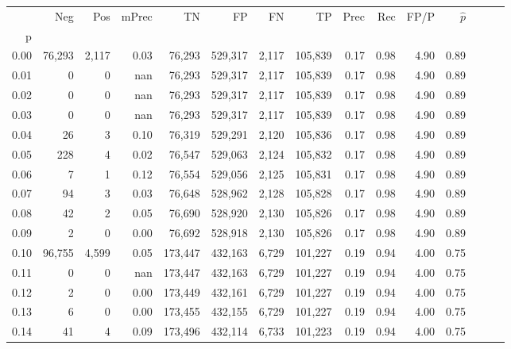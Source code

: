 \begin{tabular}{rrrrrrrrrrrrrrr}
\toprule
{} &     Neg &     Pos & mPrec &       TN &       FP &       FN &       TP &  Prec &   Rec &  FP/P & $\hat{p}$ \\
p    &         &         &       &          &          &          &          &       &       &       &           \\
\midrule
0.00 &  76,293 &   2,117 &  0.03 &   76,293 &  529,317 &    2,117 &  105,839 &  0.17 &  0.98 &  4.90 &      0.89 \\
0.01 &       0 &       0 &   nan &   76,293 &  529,317 &    2,117 &  105,839 &  0.17 &  0.98 &  4.90 &      0.89 \\
0.02 &       0 &       0 &   nan &   76,293 &  529,317 &    2,117 &  105,839 &  0.17 &  0.98 &  4.90 &      0.89 \\
0.03 &       0 &       0 &   nan &   76,293 &  529,317 &    2,117 &  105,839 &  0.17 &  0.98 &  4.90 &      0.89 \\
0.04 &      26 &       3 &  0.10 &   76,319 &  529,291 &    2,120 &  105,836 &  0.17 &  0.98 &  4.90 &      0.89 \\
0.05 &     228 &       4 &  0.02 &   76,547 &  529,063 &    2,124 &  105,832 &  0.17 &  0.98 &  4.90 &      0.89 \\
0.06 &       7 &       1 &  0.12 &   76,554 &  529,056 &    2,125 &  105,831 &  0.17 &  0.98 &  4.90 &      0.89 \\
0.07 &      94 &       3 &  0.03 &   76,648 &  528,962 &    2,128 &  105,828 &  0.17 &  0.98 &  4.90 &      0.89 \\
0.08 &      42 &       2 &  0.05 &   76,690 &  528,920 &    2,130 &  105,826 &  0.17 &  0.98 &  4.90 &      0.89 \\
0.09 &       2 &       0 &  0.00 &   76,692 &  528,918 &    2,130 &  105,826 &  0.17 &  0.98 &  4.90 &      0.89 \\
0.10 &  96,755 &   4,599 &  0.05 &  173,447 &  432,163 &    6,729 &  101,227 &  0.19 &  0.94 &  4.00 &      0.75 \\
0.11 &       0 &       0 &   nan &  173,447 &  432,163 &    6,729 &  101,227 &  0.19 &  0.94 &  4.00 &      0.75 \\
0.12 &       2 &       0 &  0.00 &  173,449 &  432,161 &    6,729 &  101,227 &  0.19 &  0.94 &  4.00 &      0.75 \\
0.13 &       6 &       0 &  0.00 &  173,455 &  432,155 &    6,729 &  101,227 &  0.19 &  0.94 &  4.00 &      0.75 \\
0.14 &      41 &       4 &  0.09 &  173,496 &  432,114 &    6,733 &  101,223 &  0.19 &  0.94 &  4.00 &      0.75 \\

\end{tabular}
